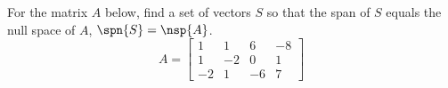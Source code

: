 For the matrix $A$ below, find a set of vectors $S$ so that the span of $S$ equals the null space of $A$, $\spn{S}=\nsp{A}$.
%
\begin{equation*}
A=
\begin{bmatrix}
1 & 1 & 6 & -8\\
1 & -2 & 0 & 1\\
-2 & 1 & -6 & 7
\end{bmatrix}
\end{equation*}
%
